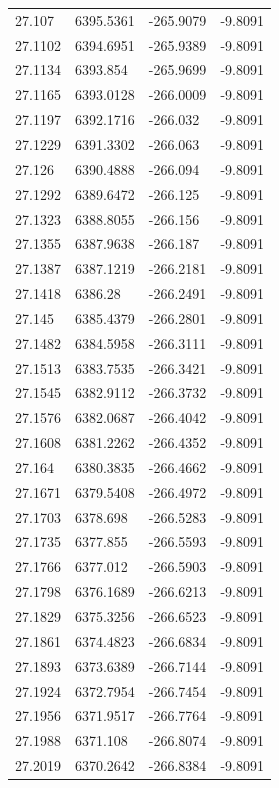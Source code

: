 \begin{table}[H]
\begin{tabular}{llll}
27.107 & 6395.5361 & -265.9079 & -9.8091 \\
27.1102 & 6394.6951 & -265.9389 & -9.8091 \\
27.1134 & 6393.854 & -265.9699 & -9.8091 \\
27.1165 & 6393.0128 & -266.0009 & -9.8091 \\
27.1197 & 6392.1716 & -266.032 & -9.8091 \\
27.1229 & 6391.3302 & -266.063 & -9.8091 \\
27.126 & 6390.4888 & -266.094 & -9.8091 \\
27.1292 & 6389.6472 & -266.125 & -9.8091 \\
27.1323 & 6388.8055 & -266.156 & -9.8091 \\
27.1355 & 6387.9638 & -266.187 & -9.8091 \\
27.1387 & 6387.1219 & -266.2181 & -9.8091 \\
27.1418 & 6386.28 & -266.2491 & -9.8091 \\
27.145 & 6385.4379 & -266.2801 & -9.8091 \\
27.1482 & 6384.5958 & -266.3111 & -9.8091 \\
27.1513 & 6383.7535 & -266.3421 & -9.8091 \\
27.1545 & 6382.9112 & -266.3732 & -9.8091 \\
27.1576 & 6382.0687 & -266.4042 & -9.8091 \\
27.1608 & 6381.2262 & -266.4352 & -9.8091 \\
27.164 & 6380.3835 & -266.4662 & -9.8091 \\
27.1671 & 6379.5408 & -266.4972 & -9.8091 \\
27.1703 & 6378.698 & -266.5283 & -9.8091 \\
27.1735 & 6377.855 & -266.5593 & -9.8091 \\
27.1766 & 6377.012 & -266.5903 & -9.8091 \\
27.1798 & 6376.1689 & -266.6213 & -9.8091 \\
27.1829 & 6375.3256 & -266.6523 & -9.8091 \\
27.1861 & 6374.4823 & -266.6834 & -9.8091 \\
27.1893 & 6373.6389 & -266.7144 & -9.8091 \\
27.1924 & 6372.7954 & -266.7454 & -9.8091 \\
27.1956 & 6371.9517 & -266.7764 & -9.8091 \\
27.1988 & 6371.108 & -266.8074 & -9.8091 \\
27.2019 & 6370.2642 & -266.8384 & -9.8091 \\

\end{tabular}
\end{table}
